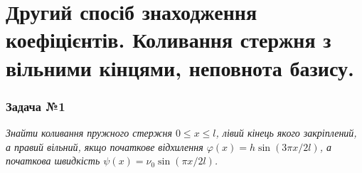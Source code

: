 \documentclass[a4paper, 14pt]{extreport}
\begin{document}
\section{Другий спосіб знаходження коефіцієнтів. Коливання стержня з вільними кінцями, неповнота базису.}

\subsubsection{Задача №1}

\textit{Знайти коливання пружного стержня $0 \leq x \leq l$, лівий кінець якого закріплений, а правий вільний, якщо початкове відхилення $\varphi(x) = h \sin(3\pi x/2l)$, а початкова швидкість $\psi(x) = \nu_0 \sin(\pi x/2l)$.}
\end{document}
